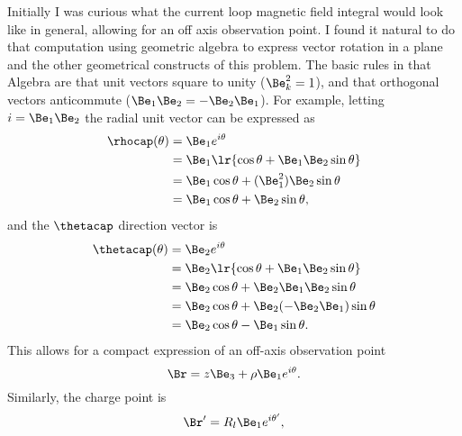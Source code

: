 %
%
%
Initially I was curious what the current loop magnetic field integral would look like in general, allowing for an off axis observation point.
%
I found it natural to do that computation using geometric algebra to express vector rotation in a plane and the other geometrical constructs of this problem.  The basic rules in that Algebra are that unit vectors square to unity (\(\Be_k^2 = 1 \)), and that orthogonal vectors anticommute (\( \Be_1 \Be_2 = -\Be_2 \Be_1 \)).  For example, letting \( i = \Be_1 \Be_2 \) the radial unit vector can be expressed as
%
\begin{equation}\label{eqn:emtProblemSet3Problem2:160}
\begin{aligned}
\rhocap(\theta)
&=
\Be_1 e^{i \theta}
\\ &= \Be_1 \lr{ \cos\theta + \Be_1 \Be_2 \sin\theta }
\\ &= \Be_1 \cos\theta + (\Be_1^2) \Be_2 \sin\theta
\\ &= \Be_1 \cos\theta + \Be_2 \sin\theta,
\end{aligned}
\end{equation}
%
and the \( \thetacap \) direction vector is
\begin{equation}\label{eqn:emtProblemSet3Appendix:240}
\begin{aligned}
\thetacap(\theta)
&=
\Be_2 e^{i \theta}
\\ &= \Be_2 \lr{ \cos\theta + \Be_1 \Be_2 \sin\theta }
\\ &= \Be_2 \cos\theta + \Be_2 \Be_1 \Be_2 \sin\theta
\\ &= \Be_2 \cos\theta + \Be_2 (-\Be_2 \Be_1) \sin\theta
\\ &= \Be_2 \cos\theta - \Be_1 \sin\theta.
\end{aligned}
\end{equation}
%
This allows for a compact expression of an off-axis observation point
%
\begin{equation}\label{eqn:emtProblemSet3Problem2:60}
\Br = z \Be_3 + \rho \Be_1 e^{i\theta}.
\end{equation}
%
Similarly, the charge point is
\begin{equation}\label{eqn:emtProblemSet3Problem2:80}
\Br' = R_l \Be_1 e^{i \theta'},
\end{equation}
